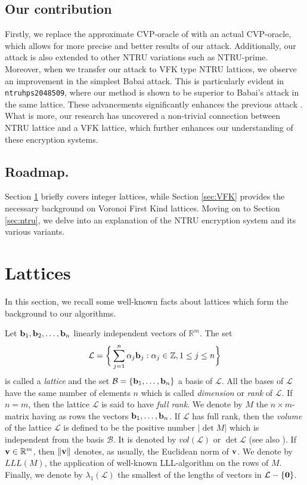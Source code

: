\documentclass{amsart}
\numberwithin{equation}{section}
\begin{document}
\subsection{Our contribution}
Firstly, we replace the approximate CVP-oracle of \cite{adam_draz} with an actual CVP-oracle, which allows for more precise and better results of our attack. Additionally, our attack is also extended to other NTRU variations such as NTRU-prime. Moreover, when we transfer our attack to VFK type NTRU lattices, we observe an improvement in the simplest Babai attack. This is particularly evident in \texttt{ntruhps2048509}, where our method is shown to be superior to Babai's attack in the same lattice. These advancements significantly  enhances the previous attack \cite{adam_draz}. What is more, our research has uncovered a non-trivial connection between NTRU lattice and a VFK lattice, which further enhances our understanding of these encryption systems. 

\subsection{Roadmap.}
Section  \ref{sec:lattices} briefly covers integer lattices, while Section \ref{sec:VFK}  provides the necessary background on Voronoi First Kind lattices. Moving on to Section \ref{sec:ntru}, we delve into an explanation of the NTRU encryption system and its various variants.

\section{Lattices}\label{sec:lattices}

In this section, we recall some well-known facts about lattices which form the 
background to our algorithms.

Let ${{\bf{b}}_1,{\bf{b}}_2,\ldots,{\bf{b}}_n}$ linearly independent vectors of 
${\mathbb{R}}^{m}$.
The set 
\[\mathcal{L} = \bigg{\{} \sum_{j=1}^{n}\alpha_j{\bf{b}}_j :
 \alpha_j\in\mathbb{Z}, 1\leq j\leq n\bigg{\}}\]
is called  a {\em lattice} and 
the set $\mathcal{B} = \{{\bf{b}}_1,\ldots,{\bf{b}}_n\}$ a basis of 
$\mathcal{L}$. 
All the bases of $\mathcal{L}$ have the same number of elements $n$ which is  called
 {\em dimension} or {\em rank} of $\mathcal{L}$. If $n=m$, then
the lattice $\mathcal{L}$ is said to have {\em full rank}. 
We denote by $M$ the $n\times m$-matrix  having as rows the vectors 
${\bf{b}}_1,\ldots,{\bf{b}}_n$. 
If $\mathcal{L}$ has full rank, then the {\em volume} of the lattice
 $\mathcal{L}$ is defined to be the positive number
 $|\det{M}|$ which is independent from the basis $\mathcal{B}$. It is denoted 
 by $vol(\mathcal{L})$ or $\det{\mathcal{L}}$ (see also \cite{gal}).
 If ${\bf v}\in \mathbb{R}^m$, then $\|{\bf v}\|$ denotes, as usually, the
 Euclidean norm of ${\bf v}$. 
 We denote by $LLL(M)$, the application of well-known LLL-algorithm on the rows of $M$.
 Finally,   we denote by 
$\lambda_1(\mathcal{L})$ the smallest of the lengths of vectors in 
$ \mathcal{L}-\{ \bf 0\}$.
  
\end{document}
